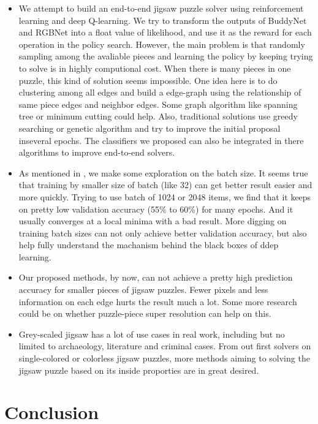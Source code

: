 \documentclass{article}
\begin{document}
\begin{itemize}
    \item We attempt to build an end-to-end jigsaw puzzle solver using reinforcement learning and deep Q-learning. We try to transform the outputs of BuddyNet and RGBNet into a float value of likelihood, and use it as the reward for each operation in the policy search. However, the main problem is that randomly sampling among the avaliable pieces and learning the policy by keeping trying to solve is in highly computional cost. When there is many pieces in one puzzle, this kind of solution seems impossible. One idea here is to do clustering among all edges and build a edge-graph using the relationship of same piece edges and neighbor edges. Some graph algorithm like spanning tree or minimum cutting could help. Also, traditional solutions use greedy searching or genetic algorithm and try to improve the initial proposal inseveral epochs. The classifiers we proposed can also be integrated in there algorithms to improve end-to-end solvers.
    \item As mentioned in \cite{masters2018revisiting}, we make some exploration on the batch size. It seems true that training by smaller size of batch (like 32) can get better result easier and more quickly. Trying to use batch of 1024 or 2048 items, we find that it keeps on pretty low validation accuracy (55\% to 60\%) for many epochs. And it usually converges at a local minima with a bad result. More digging on training batch sizes can not only achieve better validation accuracy, but also help fully understand the machanism behind the black boxes of ddep learning.
    \item Our proposed methods, by now, can not achieve a pretty high prediction accuracy for smaller pieces of jigsaw puzzles. Fewer pixels  and less information on each edge hurts the result much a lot. Some more research could be on whether puzzle-piece super resolution can help on this.
    \item Grey-scaled jigsaw has a lot of use cases in real work, including but no limited to archaeology, literature and criminal cases. From out first solvers on single-colored or colorless jigsaw puzzles, more methods aiming to solving the jigsaw puzzle based on its inside proporties are in great desired.
\end{itemize}

\section{Conclusion}





\end{document}
